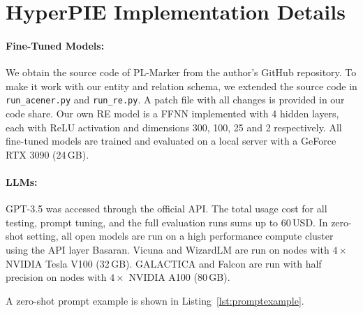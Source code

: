 \section{HyperPIE Implementation Details}\label{app:hyperpie-implementation-details}

\paragraph{Fine-Tuned Models:}
We obtain the source code of PL-Marker from the author's GitHub repository. To make it work with our entity and relation schema, we extended the source code in \texttt{run\_acener.py} and \texttt{run\_re.py}. A patch file with all changes is provided in our code share. Our own RE model is a FFNN implemented with 4 hidden layers, each with ReLU activation and dimensions 300, 100, 25 and 2 respectively. All fine-tuned models are trained and evaluated on a local server with a GeForce RTX 3090 (24\,GB).


\paragraph{LLMs:}
GPT-3.5 was accessed through the official API. The total usage cost for all testing, prompt tuning, and the full evaluation runs sums up to 60\,USD. In zero-shot setting, all open models are run on a high performance compute cluster using the API layer Basaran. Vicuna and WizardLM  are run on nodes with $4\times$ NVIDIA Tesla V100 (32\,GB). GALACTICA and Falcon are run with half precision on nodes with $4\times$ NVIDIA A100 (80\,GB).

A zero-shot prompt example is shown in Listing~\ref{lst:promptexample}.

